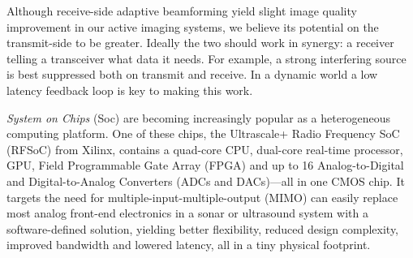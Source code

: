 Although receive-side adaptive beamforming yield slight image quality improvement in our active imaging systems, we believe its potential on the transmit-side to be greater. Ideally the two should work in synergy: a receiver telling a transceiver what data it needs. For example, a strong interfering source is best suppressed both on transmit and receive. In a dynamic world a low latency feedback loop is key to making this work. 


\emph{System on Chips} (Soc) are becoming increasingly popular as a heterogeneous computing platform. One of these chips, the Ultrascale+ Radio Frequency SoC (RFSoC) from Xilinx, contains a quad-core CPU, dual-core real-time processor, GPU, Field Programmable Gate Array (FPGA) and up to 16 Analog-to-Digital and Digital-to-Analog Converters (ADCs and DACs)---all in one CMOS chip. It targets the need for multiple-input-multiple-output (MIMO) can easily replace most analog front-end electronics in a sonar or ultrasound system with a software-defined solution, yielding better flexibility, reduced design complexity, improved bandwidth and lowered latency, all in a tiny physical footprint.


